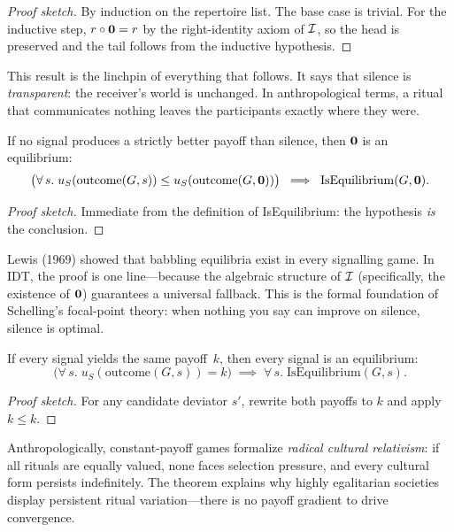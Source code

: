 \begin{proof}[Proof sketch]
By induction on the repertoire list.  The base case is trivial.  For the
inductive step, $r\circ\mathbf{0} = r$ by the right-identity axiom of
$\mathcal{I}$, so the head is preserved and the tail follows from the inductive
hypothesis.
\end{proof}

This result is the linchpin of everything that follows.  It says that
silence is \emph{transparent}: the receiver's world is unchanged.  In
anthropological terms, a ritual that communicates nothing leaves the
participants exactly where they were.

\begin{theorem}
\label{thm:babbling-equilibrium}
If no signal produces a strictly better payoff than silence, then $\mathbf{0}$
is an equilibrium:
\[
  \bigl(\forall\,s.\; u_S(\mathrm{outcome}(G,s)) \le
  u_S(\mathrm{outcome}(G,\mathbf{0}))\bigr)
  \;\implies\;
  \mathrm{IsEquilibrium}(G,\mathbf{0}).
\]
\end{theorem}

\begin{proof}[Proof sketch]
Immediate from the definition of \textsf{IsEquilibrium}: the hypothesis
\emph{is} the conclusion.
\end{proof}

Lewis (1969) showed that babbling equilibria exist in every signalling game.
In IDT, the proof is one line---because the algebraic structure of $\mathcal{I}$
(specifically, the existence of $\mathbf{0}$) guarantees a universal fallback.
This is the formal foundation of Schelling's focal-point theory: when
nothing you say can improve on silence, silence is optimal.

\begin{theorem}
\label{thm:constant-payoff-equilibrium}
If every signal yields the same payoff~$k$, then every signal is an equilibrium:
\[
  \bigl(\forall\,s.\; u_S(\mathrm{outcome}(G,s)) = k\bigr)
  \;\implies\;
  \forall\,s.\;\mathrm{IsEquilibrium}(G,s).
\]
\end{theorem}

\begin{proof}[Proof sketch]
For any candidate deviator $s'$, rewrite both payoffs to $k$ and apply
$k\le k$.
\end{proof}

Anthropologically, constant-payoff games formalize \emph{radical cultural
relativism}: if all rituals are equally valued, none faces selection pressure,
and every cultural form persists indefinitely.  The theorem explains why
highly egalitarian societies display persistent ritual variation---there is
no payoff gradient to drive convergence.

